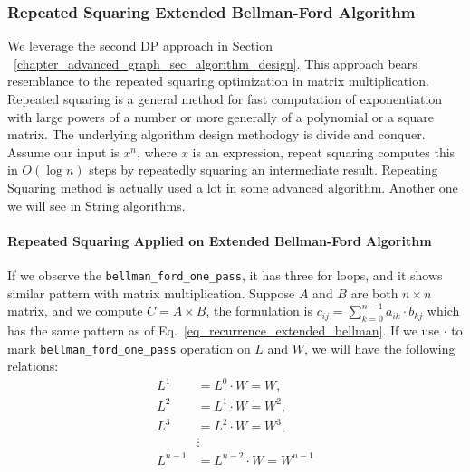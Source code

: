 \documentclass[../main.tex]{subfiles}
\begin{document}
\subsubsection{Repeated Squaring Extended Bellman-Ford Algorithm}
We leverage the second DP approach in Section ~\ref{chapter_advanced_graph_sec_algorithm_design}. This approach bears resemblance to the repeated squaring optimization in matrix multiplication. %
Repeated squaring is a general method for fast computation of exponentiation with large powers of a number or more generally of a polynomial or a square matrix.  The underlying algorithm design methodogy is divide and conquer. Assume our input is $x^{n}$, where $x$ is an expression, repeat squaring computes this in $O(\log n)$ steps by repeatedly squaring an intermediate result. Repeating Squaring method is actually used a lot in some advanced algorithm. Another one we will see in String algorithms. 
\paragraph{Repeated Squaring Applied on Extended Bellman-Ford Algorithm}
If we observe the \texttt{bellman\_ford\_one\_pass}, it has three for loops, and it shows similar pattern with matrix multiplication. Suppose $A$ and $B$ are both $n\times n$ matrix, and we compute $C=A\times B$, the formulation is $c_{ij} = \sum_{k=0}^{n-1} a_{ik}\cdot b_{kj}$ which has the same pattern as of Eq.~\ref{eq_recurrence_extended_bellman}.  If we use $\cdot$ to mark \texttt{bellman\_ford\_one\_pass} operation on $L$ and $W$, we will have the following relations:
\begin{align}
    L^{1} &= L^{0}\cdot W = W,\\\nonumber
    L^{2 }&= L^{1}\cdot W = W^2, \\\nonumber
    L^{3 }&= L^{2}\cdot W = W^3, \\\nonumber
     &\vdots\\\nonumber
     L^{n-1 }&= L^{n-2}\cdot W = W^{n-1}\nonumber
\end{align}
\end{document}
